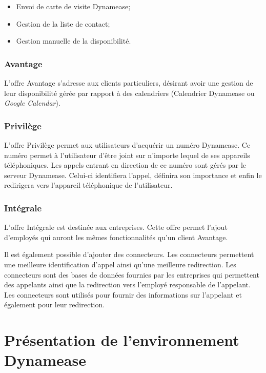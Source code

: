 \begin{itemize}
	\item Envoi de carte de visite Dynamease;
	\item Gestion de la liste de contact;
	\item Gestion manuelle de la disponibilité.
\end{itemize}

\subsubsection{Avantage}

L'offre Avantage s'adresse aux clients particuliers, désirant avoir une gestion de leur disponibilité gérée par rapport à des calendriers (Calendrier Dynamease ou \textit{Google Calendar}).

\subsubsection{Privilège}

L'offre Privilège permet aux utilisateurs d'acquérir un numéro Dynamease. Ce numéro permet à l'utilisateur d'être joint sur n'importe lequel de ses appareils téléphoniques. Les appels entrant en direction de ce numéro sont gérés par le serveur Dynamease. Celui-ci identifiera l'appel, définira son importance et enfin le redirigera vers l'appareil téléphonique de l'utilisateur.

\subsubsection{Intégrale}

L'offre Intégrale est destinée aux entreprises. Cette offre permet l'ajout d'employés qui auront les mêmes fonctionnalités qu'un client  Avantage.

Il est également possible d'ajouter des connecteurs. Les connecteurs permettent une meilleure identification d'appel ainsi qu'une meilleure redirection. Les connecteurs sont des bases de données fournies par les entreprises qui permettent des appelants ainsi que la redirection vers l'employé responsable de l'appelant. Les connecteurs sont utilisés pour fournir des informations sur l'appelant et également pour leur redirection.

\section{Présentation de l'environnement Dynamease}


